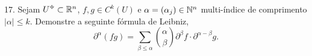 %
17. Sejam \(U\ab \subset \R^n\), \(f,g \in C^k(U)\) e \(\alpha = (\alpha_j) \in \mathbb{N}^n\) multi-índice de comprimento \(|\alpha|\leq k\). Demonstre a seguinte fórmula de Leibniz, 
\[\partial^\alpha(fg) = \sum_{\beta \leq \alpha} \binom{\alpha}{\beta} \partial^\beta f \cdot \partial^{\alpha - \beta} g.\] 

